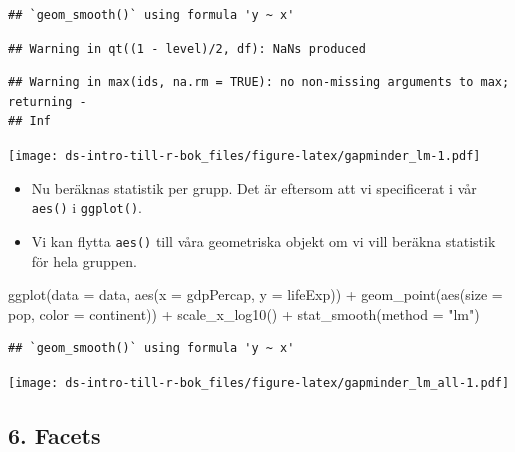 \documentclass[
]{book}
\newenvironment{Shaded}{\begin{snugshade}}{\end{snugshade}}
\newcommand{\AttributeTok}[1]{\textcolor[rgb]{0.77,0.63,0.00}{#1}}
\newcommand{\FunctionTok}[1]{\textcolor[rgb]{0.00,0.00,0.00}{#1}}
\newcommand{\NormalTok}[1]{#1}
\newcommand{\SpecialCharTok}[1]{\textcolor[rgb]{0.00,0.00,0.00}{#1}}
\newcommand{\StringTok}[1]{\textcolor[rgb]{0.31,0.60,0.02}{#1}}
\begin{document}
\begin{verbatim}
## `geom_smooth()` using formula 'y ~ x'
\end{verbatim}

\begin{verbatim}
## Warning in qt((1 - level)/2, df): NaNs produced
\end{verbatim}

\begin{verbatim}
## Warning in max(ids, na.rm = TRUE): no non-missing arguments to max; returning -
## Inf
\end{verbatim}

\texttt{[image: ds-intro-till-r-bok\_files/figure-latex/gapminder\_lm-1.pdf]}

\begin{itemize}
\item
  Nu beräknas statistik per grupp. Det är eftersom att vi specificerat i vår \texttt{aes()} i \texttt{ggplot()}.
\item
  Vi kan flytta \texttt{aes()} till våra geometriska objekt om vi vill beräkna statistik för hela gruppen.
\end{itemize}

\begin{Shaded}
\begin{Highlighting}[]
\FunctionTok{ggplot}\NormalTok{(}\AttributeTok{data =}\NormalTok{ data, }\FunctionTok{aes}\NormalTok{(}\AttributeTok{x =}\NormalTok{ gdpPercap, }\AttributeTok{y =}\NormalTok{ lifeExp)) }\SpecialCharTok{+}
  \FunctionTok{geom\_point}\NormalTok{(}\FunctionTok{aes}\NormalTok{(}\AttributeTok{size =}\NormalTok{ pop, }\AttributeTok{color =}\NormalTok{ continent)) }\SpecialCharTok{+}
  \FunctionTok{scale\_x\_log10}\NormalTok{() }\SpecialCharTok{+}
  \FunctionTok{stat\_smooth}\NormalTok{(}\AttributeTok{method =} \StringTok{"lm"}\NormalTok{)}
\end{Highlighting}
\end{Shaded}

\begin{verbatim}
## `geom_smooth()` using formula 'y ~ x'
\end{verbatim}

\texttt{[image: ds-intro-till-r-bok\_files/figure-latex/gapminder\_lm\_all-1.pdf]}

\hypertarget{facets}{%
\subsection{6. Facets}\label{facets}}
\end{document}
